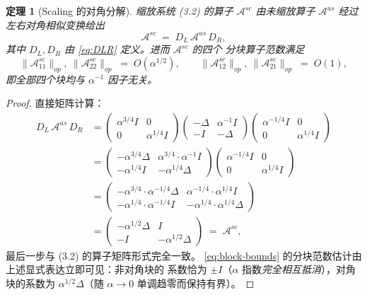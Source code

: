 \documentclass{xmu}
\theoremstyle{plain}
\newtheorem{theorem}{定理}[chapter]
\theoremstyle{remark}
\begin{document}
\begin{theorem}[Scaling 的对角分解]
\label{thm:scaling-decomp}
缩放系统 (3.2) 的算子 $\mathcal{A}^{sc}$ 由未缩放算子 $\mathcal{A}^{us}$
经过左右对角相似变换给出
\begin{equation}
\mathcal{A}^{sc} \;=\; D_L\,\mathcal{A}^{us}\,D_R,
\label{eq:decomp}
\end{equation}
其中 $D_L, D_R$ 由 \eqref{eq:DLR} 定义。进而 $\mathcal{A}^{sc}$ 的四个
分块算子范数满足
\begin{equation}
\|\mathcal{A}^{sc}_{11}\|_{op},\ \|\mathcal{A}^{sc}_{22}\|_{op}
\;=\; O(\alpha^{1/2}),
\qquad
\|\mathcal{A}^{sc}_{12}\|_{op},\ \|\mathcal{A}^{sc}_{21}\|_{op}
\;=\; O(1),
\label{eq:block-bounds}
\end{equation}
即\emph{全部四个块均与 $\alpha^{-1}$ 因子无关}。
\end{theorem}

\begin{proof}
直接矩阵计算：
\begin{align*}
D_L\,\mathcal{A}^{us}\,D_R
&= \begin{pmatrix}\alpha^{3/4}I & 0\\[1pt] 0 & \alpha^{1/4}I\end{pmatrix}
   \begin{pmatrix}-\Delta & \alpha^{-1}I\\[1pt] -I & -\Delta\end{pmatrix}
   \begin{pmatrix}\alpha^{-1/4}I & 0\\[1pt] 0 & \alpha^{1/4}I\end{pmatrix} \\[4pt]
&= \begin{pmatrix}
      -\alpha^{3/4}\Delta & \alpha^{3/4}\!\cdot\!\alpha^{-1}I \\[3pt]
      -\alpha^{1/4}I & -\alpha^{1/4}\Delta
   \end{pmatrix}
   \begin{pmatrix}\alpha^{-1/4}I & 0\\[1pt] 0 & \alpha^{1/4}I\end{pmatrix} \\[4pt]
&= \begin{pmatrix}
      -\alpha^{3/4}\!\cdot\!\alpha^{-1/4}\Delta
      & \alpha^{-1/4}\!\cdot\!\alpha^{1/4}I \\[3pt]
      -\alpha^{1/4}\!\cdot\!\alpha^{-1/4}I
      & -\alpha^{1/4}\!\cdot\!\alpha^{1/4}\Delta
   \end{pmatrix} \\[4pt]
&= \begin{pmatrix}-\alpha^{1/2}\Delta & I\\[3pt] -I & -\alpha^{1/2}\Delta\end{pmatrix}
   \;=\; \mathcal{A}^{sc},
\end{align*}
最后一步与 (3.2) 的算子矩阵形式完全一致。
\eqref{eq:block-bounds} 的分块范数估计由上述显式表达立即可见：非对角块的
系数恰为 $\pm I$（$\alpha$ 指数\emph{完全相互抵消}），对角块的系数为
$\alpha^{1/2}\Delta$（随 $\alpha\to 0$ 单调趋零而保持有界）。
\end{proof}
\end{document}
